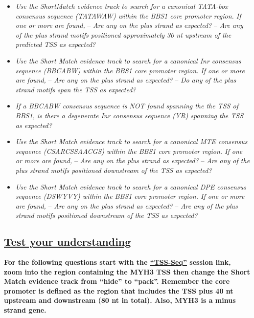 \documentclass[
]{book}
\providecommand{\tightlist}{%
  \setlength{\itemsep}{0pt}\setlength{\parskip}{0pt}}
\begin{document}
\begin{itemize}
\tightlist
\item
  \emph{Use the ShortMatch evidence track to search for a canonical TATA-box consensus sequence (TATAWAW) within the BBS1 core promoter region. If one or more are found,}
  -- \emph{Are any on the plus strand as expected?}
  -- \emph{Are any of the plus strand motifs positioned approximately 30 nt upstream of the predicted TSS as expected?}
\item
  \emph{Use the Short Match evidence track to search for a canonical Inr consensus sequence (BBCABW) within the BBS1 core promoter region. If one or more are found,}
  -- \emph{Are any on the plus strand as expected?}
  -- \emph{Do any of the plus strand motifs span the TSS as expected?}
\item
  \emph{If a BBCABW consensus sequence is NOT found spanning the the TSS of BBS1, is there a degenerate Inr consensus sequence (YR) spanning the TSS as expected?}
\item
  \emph{Use the Short Match evidence track to search for a canonical MTE consensus sequence (CSARCSSAACGS) within the BBS1 core promoter region. If one or more are found,}
  -- \emph{Are any on the plus strand as expected?}
  -- \emph{Are any of the plus strand motifs positioned downstream of the TSS as expected?}
\item
  \emph{Use the Short Match evidence track to search for a canonical DPE consensus sequence (DSWYVY) within the BBS1 core promoter region. If one or more are found,}
  -- \emph{Are any on the plus strand as expected?}
  -- \emph{Are any of the plus strand motifs positioned downstream of the TSS as expected?}
\end{itemize}

\hypertarget{test-your-understanding-16}{%
\subsection{\texorpdfstring{\href{https://docs.google.com/forms/d/e/1FAIpQLSfMGNjfgSnl-GVNBXiKnLIA0yDvAZKE9kAO11CqdXAPRDa3Gw/viewform?usp=sf_link}{Test your understanding}}{Test your understanding}}\label{test-your-understanding-16}}

\textbf{For the following questions start with the \href{https://genome.ucsc.edu/s/megallegos/Biol\%20310\%3A\%20Module\%202\%20TSS\%2Dseq}{``TSS-Seq''} session link, zoom into the region containing the MYH3 TSS then change the Short Match evidence track from ``hide'' to ``pack''. Remember the core promoter is defined as the region that includes the TSS plus 40 nt upstream and downstream (80 nt in total). Also, MYH3 is a minus strand gene.}
\end{document}
